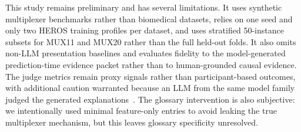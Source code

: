 \documentclass[sigconf]{acmart}
\begin{document}

This study remains preliminary and has several limitations. It uses synthetic multiplexer benchmarks rather than biomedical datasets, relies on one seed and only two HEROS training profiles per dataset, and uses stratified 50-instance subsets for MUX11 and MUX20 rather than the full held-out folds. It also omits non-LLM presentation baselines and evaluates fidelity to the model-generated prediction-time evidence packet rather than to human-grounded causal evidence. The judge metrics remain proxy signals rather than participant-based outcomes, with additional caution warranted because an LLM from the same model family judged the generated explanations~\cite{liu2023geval,huang2025judge}. The glossary intervention is also subjective: we intentionally used minimal feature-only entries to avoid leaking the true multiplexer mechanism, but this leaves glossary specificity unresolved.
\end{document}
